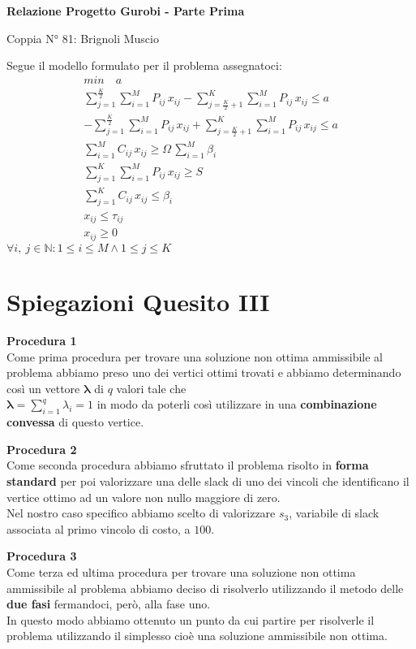 \documentclass[12pt]{article}
\begin{document}
  \begin{center}
    \Large\textbf{Relazione Progetto Gurobi - Parte Prima}

    \small Coppia N° 81: Brignoli Muscio
  \end{center}\bigskip

  Segue il modello formulato per il problema assegnatoci:
  \begin{gather*}
    min\quad a \\
    \sum_{j=1}^{\frac{K}{2}}\sum_{i=1}^{M}P_{ij}\,x_{ij}-\sum_{j=\frac{K}{2}+1}^{K}\sum_{i=1}^{M}P_{ij}\,x_{ij}\leq a \\
    -\sum_{j=1}^{\frac{K}{2}}\sum_{i=1}^{M}P_{ij}\,x_{ij}+\sum_{j=\frac{K}{2}+1}^{K}\sum_{i=1}^{M}P_{ij}\,x_{ij}\leq a \\
    \sum_{i=1}^M C_{ij}\,x_{ij}\geq \Omega\,\sum_{i=1}^M\beta_i \\
    \sum_{j=1}^{K}\sum_{i=1}^{M} P_{ij}\,x_{ij}\geq S \\
    \sum_{j=1}^K C_{ij}\,x_{ij}\leq \beta_i \\
    x_{ij}\leq \tau_{ij} \\
    x_{ij}\geq 0
  \end{gather*}
  \hfill$\forall i,\:j\in\mathbb{N}:1\leq i\leq M\wedge1\leq j\leq K$

  \section*{Spiegazioni Quesito III}
  {\Large\bfseries Procedura 1}\\
  Come prima procedura per trovare una soluzione non ottima ammissibile al problema abbiamo preso uno dei vertici ottimi trovati e abbiamo determinando così un vettore $\boldsymbol{\lambda}$ di $q$ valori tale che \\ 
  $\boldsymbol{\lambda}={\displaystyle\sum_{i=1}^q}\lambda_i=1$ in modo da poterli così utilizzare in una \textbf{combinazione convessa} di questo vertice.\bigskip\bigskip
  
  {\Large\bfseries Procedura 2}\\
  Come seconda procedura abbiamo sfruttato il problema risolto in \textbf{forma standard} per poi valorizzare una delle slack di uno dei vincoli che identificano il vertice ottimo ad un valore non nullo maggiore di zero.\\
  Nel nostro caso specifico abbiamo scelto di valorizzare $s_3$, variabile di slack associata al primo vincolo di costo, a $100$.\bigskip\bigskip

  {\Large\bfseries Procedura 3}\\
  Come terza ed ultima procedura per trovare una soluzione non ottima ammissibile al problema abbiamo deciso di risolverlo utilizzando il metodo delle \textbf{due fasi} fermandoci, però, alla fase uno.\\
  In questo modo abbiamo ottenuto un punto da cui partire per risolverle il problema utilizzando il simplesso cioè una soluzione ammissibile non ottima.
\end{document}
